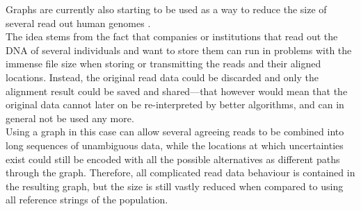 \documentclass[a4paper,12pt,twoside,BCOR=10mm]{scrbook}
\begin{document}
Graphs are currently also starting to be used as a way to reduce the size of several read out human 
genomes \citep{Li2014}. \\
The idea stems from the fact that companies or institutions that read out the DNA of several individuals 
and want to store them can run in problems with the immense file size when storing or transmitting the reads and their 
aligned locations. Instead, the original read data could be discarded and only the alignment result could be saved and shared---that 
however would mean that the original data cannot later on be re-interpreted by better algorithms, and can in general 
not be used any more. \\
Using a graph in this case can allow several agreeing reads to be combined into long sequences of unambiguous data, 
while the locations at which uncertainties exist could still be encoded with all the possible alternatives as 
different paths through the graph. Therefore, all complicated read data behaviour is contained in the resulting 
graph, but the size is still vastly reduced when compared to using all reference strings of the population.
\end{document}
